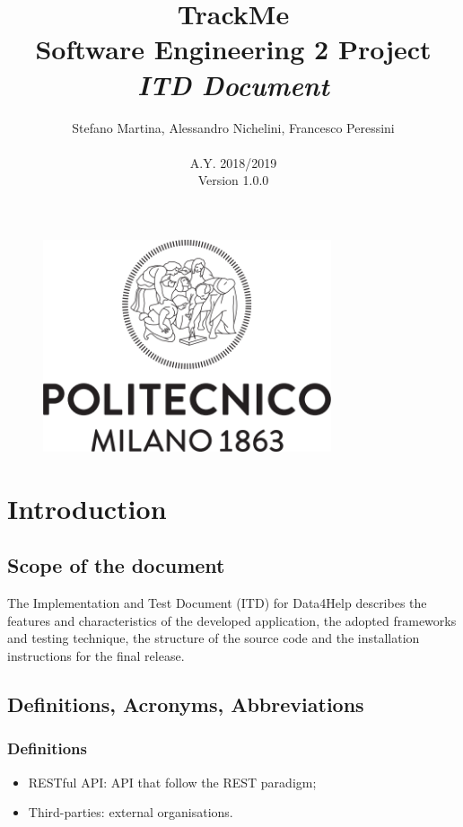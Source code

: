 \documentclass{article}
\begin{document}
\begin{figure}[t]
\centering
	\includegraphics[height=6.25cm,keepaspectratio]{Figures/logo}
\end{figure}

\title{TrackMe \\ Software Engineering 2 Project\\ \textit{ITD Document} }
\author{Stefano Martina, Alessandro Nichelini, Francesco Peressini
		\\ \\ A.Y. 2018/2019 \\ Version 1.0.0}
		
\maketitle
\newpage

\tableofcontents
\newpage

\section{Introduction}
\subsection{Scope of the document}
The Implementation and Test Document (ITD) for Data4Help describes the features and characteristics of the developed application, the adopted frameworks and testing technique, the structure of the source code and the installation instructions for the final release. 

\subsection{Definitions, Acronyms, Abbreviations}

\subsubsection{Definitions}
\begin{itemize}
	\item RESTful API: API that follow the REST paradigm;
	\item Third-parties: external organisations.
\end{itemize}
\end{document}
